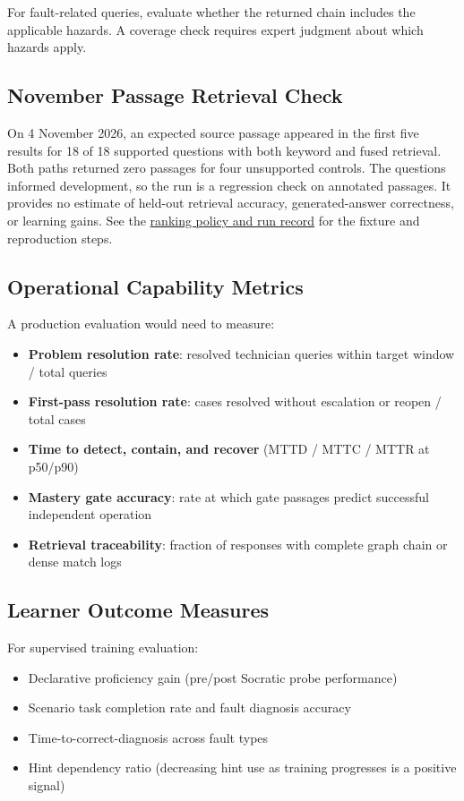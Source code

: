 \documentclass[10pt,letterpaper,twocolumn]{article}
\begin{document}
For fault-related queries, evaluate whether the returned chain includes the applicable hazards. A coverage check requires expert judgment about which hazards apply.

\subsection{November Passage Retrieval Check}
On 4 November 2026, an expected source passage appeared in the first five results for 18 of 18 supported questions with both keyword and fused retrieval. Both paths returned zero passages for four unsupported controls. The questions informed development, so the run is a regression check on annotated passages. It provides no estimate of held-out retrieval accuracy, generated-answer correctness, or learning gains.
See the \href{https://github.com/wrgr/socratic-scenarios/blob/main/docs/retrieval-ranking.md}{ranking policy and run record} for the fixture and reproduction steps.

\subsection{Operational Capability Metrics}
A production evaluation would need to measure:
\begin{itemize}
  \item \textbf{Problem resolution rate}: resolved technician queries within target window / total queries
  \item \textbf{First-pass resolution rate}: cases resolved without escalation or reopen / total cases
  \item \textbf{Time to detect, contain, and recover} (MTTD / MTTC / MTTR at p50/p90)
  \item \textbf{Mastery gate accuracy}: rate at which gate passages predict successful independent operation
  \item \textbf{Retrieval traceability}: fraction of responses with complete graph chain or dense match logs
\end{itemize}

\subsection{Learner Outcome Measures}
For supervised training evaluation:
\begin{itemize}
  \item Declarative proficiency gain (pre/post Socratic probe performance)
  \item Scenario task completion rate and fault diagnosis accuracy
  \item Time-to-correct-diagnosis across fault types
  \item Hint dependency ratio (decreasing hint use as training progresses is a positive signal)
\end{itemize}
\end{document}
